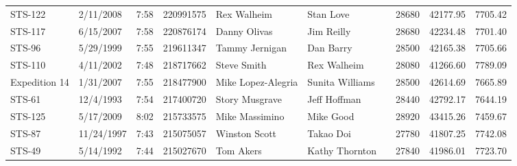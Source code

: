 \documentclass[sigconf]{acmart}
\begin{document}
\begin{table}[]
\begin{tabular}{llllllllll}
		STS-122          & 2/11/2008     & 7:58              & 220991575                              & Rex Walheim        & Stan Love            &                 & 28680                                 & 42177.95                   & 7705.42                   \\
		STS-117          & 6/15/2007     & 7:58              & 220876174                              & Danny Olivas       & Jim Reilly           &                 & 28680                                 & 42234.48                   & 7701.40                   \\
		STS-96           & 5/29/1999     & 7:55              & 219611347                              & Tammy Jernigan     & Dan Barry            &                 & 28500                                 & 42165.38                   & 7705.66                   \\
		STS-110          & 4/11/2002     & 7:48              & 218717662                              & Steve Smith        & Rex Walheim          &                 & 28080                                 & 41266.60                   & 7789.09                   \\
		Expedition 14    & 1/31/2007     & 7:55              & 218477900                              & Mike Lopez-Alegria & Sunita Williams      &                 & 28500                                 & 42614.69                   & 7665.89                   \\
		STS-61           & 12/4/1993     & 7:54              & 217400720                              & Story Musgrave     & Jeff Hoffman         &                 & 28440                                 & 42792.17                   & 7644.19                   \\
		STS-125          & 5/17/2009     & 8:02              & 215733575                              & Mike Massimino     & Mike Good            &                 & 28920                                 & 43415.26                   & 7459.67                   \\
		STS-87           & 11/24/1997    & 7:43              & 215075057                              & Winston Scott      & Takao Doi            &                 & 27780                                 & 41807.25                   & 7742.08                   \\
		STS-49           & 5/14/1992     & 7:44              & 215027670                              & Tom Akers          & Kathy Thornton       &                 & 27840                                 & 41986.01                   & 7723.70                   \\

\end{tabular}
\end{table}
\end{document}
